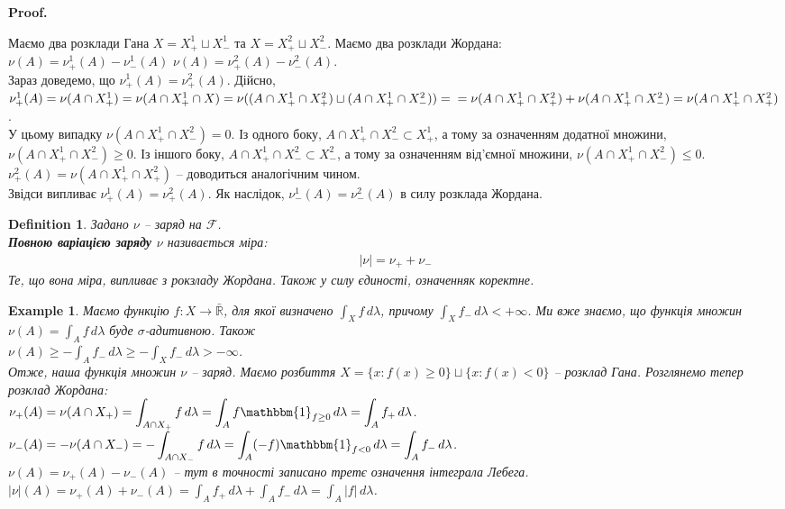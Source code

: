 \documentclass[a4paper, 10pt]{article}
\makeatletter
\theoremstyle{theoremdd}
\newtheorem{definition}[theorem]{Definition}
\newtheorem{example}[theorem]{Example}
\renewenvironment{proof}[1][Proof.\\]{\par
\pushQED{\hfill \qed}%
\normalfont \topsep6\p@\@plus6\p@\relax
\trivlist
\item\relax
{\bfseries
#1\@addpunct{.}}\hspace\labelsep\ignorespaces
}{%
\popQED\endtrivlist\@endpefalse
}
\makeatother
\begin{document}
\begin{proof}
Маємо два розклади Гана $X = X^1_+ \sqcup X^1_-$ та $X = X^2_+ \sqcup X^2_-$. Маємо два розклади Жордана:\\
$\nu(A) = \nu^1_+(A) - \nu^1_-(A)$ \qquad $\nu(A) = \nu^2_+(A) - \nu^2_-(A)$.\\
Зараз доведемо, що $\nu_+^1(A) = \nu_+^2(A)$. Дійсно,\\
$\nu_+^1(A) = \nu(A \cap X^1_+) = \nu(A \cap X^1_+ \cap X) = \nu((A \cap X^1_+ \cap X^2_+) \sqcup (A \cap X^1_+ \cap X^2_-)) = \\
= \nu(A \cap X^1_+ \cap X^2_+) + \nu(A \cap X^1_+ \cap X^2_-) = \nu(A \cap X^1_+ \cap X^2_+)$.\\
У цьому випадку $\nu(A \cap X^1_+ \cap X^2_-) = 0$. Із одного боку, $A \cap X^1_+ \cap X^2_- \subset X^1_+$, а тому за означенням додатної множини, $\nu(A \cap X^1_+ \cap X^2_-) \geq 0$. Із іншого боку, $A \cap X^1_+ \cap X^2_- \subset X^2_-$, а тому за означенням від'ємної множини, $\nu(A \cap X^1_+ \cap X^2_-) \leq 0$.\\
$\nu_+^2(A) = \nu(A \cap X^1_+ \cap X^2_+)$ -- доводиться аналогічним чином.\\
Звідси випливає $\nu_+^1(A) = \nu_+^2(A)$. Як наслідок, $\nu_-^1(A) = \nu_-^2(A)$ в силу розклада Жордана.
\end{proof}

\begin{definition}
Задано $\nu$ -- заряд на $\mathcal{F}$.\\
\textbf{Повною варіацією заряду $\nu$} називається міра:
\begin{align*}
|\nu| = \nu_+ + \nu_-
\end{align*}
Те, що вона міра, випливає з рокзладу Жордана. Також у силу єдиності, означенняк коректне.
\end{definition}

\begin{example}
Маємо функцію $f \colon X \to \bar{\mathbb{R}}$, для якої визначено $\displaystyle\int_X f\,d\lambda$, причому $\displaystyle\int_X f_-\,d\lambda < +\infty$. Ми вже знаємо, що функція множин $\nu(A) = \displaystyle\int_A f\,d\lambda$ буде $\sigma$-адитивною. Також\\
$\nu(A) \geq -\int_A f_-\,d\lambda \geq -\int_X f_-\,d\lambda > -\infty$.\\
Отже, наша функція множин $\nu$ -- заряд. Маємо розбиття $X = \{x : f(x) \geq 0\} \sqcup \{x : f(x) < 0\}$ -- розклад Гана. Розглянемо тепер розклад Жордана:\\
$\nu_+(A) = \nu(A \cap X_+) = \displaystyle\int_{A \cap X_+} f\,d\lambda = \int_A f \mathbbm{1}_{f \geq 0}\,d\lambda = \int_A f_+\,d\lambda$.\\
$\nu_-(A) = -\nu(A \cap X_-) = -\displaystyle\int_{A \cap X_-} f\,d\lambda = \int_A (-f) \mathbbm{1}_{f < 0}\,d\lambda = \int_A f_-\,d\lambda$.\\
$\nu(A) = \nu_+(A) - \nu_-(A)$ -- тут в точності записано третє означення інтеграла Лебега.\\
$\displaystyle |\nu|(A) = \nu_+(A) + \nu_-(A) = \int_A f_+\,d\lambda + \int_A f_-\,d\lambda = \int_A |f|\,d\lambda$.
\end{example}
\end{document}
